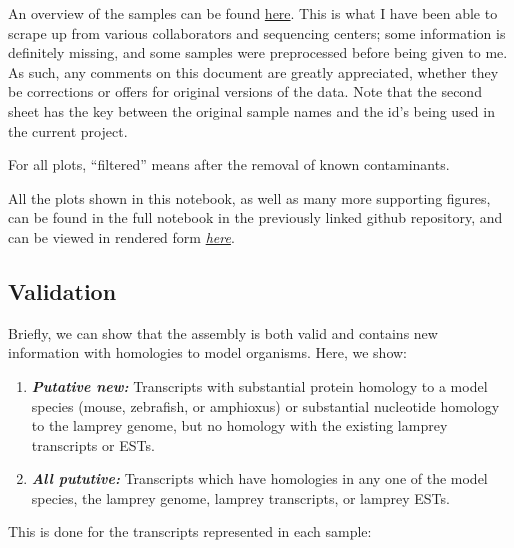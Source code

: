 \documentclass{article}
\begin{document}
An overview of the samples can be found
\href{https://docs.google.com/spreadsheet/ccc?key=0AqkPW_VPT5rAdEdmczhDeWg4UEZWdmh4dElqeXFiUlE\&usp=sharing}{here}.
This is what I have been able to scrape up from various collaborators
and sequencing centers; some information is definitely missing, and some
samples were preprocessed before being given to me. As such, any
comments on this document are greatly appreciated, whether they be
corrections or offers for original versions of the data. Note that the
second sheet has the key between the original sample names and the id's
being used in the current project.

For all plots, ``filtered'' means after the removal of known
contaminants.

All the plots shown in this notebook, as well as many more supporting
figures, can be found in the full notebook in the previously linked
github repository, and can be viewed in rendered form
\emph{\href{http://nbviewer.ipython.org/github/camillescott/2013-lamprey/blob/lamp3/pub/tale_of_two_transcriptomes_compute.ipynb}{here}}.


    \subsection{Validation}


    Briefly, we can show that the assembly is both valid and contains new
information with homologies to model organisms. Here, we show:

\begin{enumerate}
\def\labelenumi{\arabic{enumi}.}
\item
  \emph{\textbf{Putative new:}} Transcripts with substantial protein
  homology to a model species (mouse, zebrafish, or amphioxus) or
  substantial nucleotide homology to the lamprey genome, but no homology
  with the existing lamprey transcripts or ESTs.
\item
  \emph{\textbf{All pututive:}} Transcripts which have homologies in any
  one of the model species, the lamprey genome, lamprey transcripts, or
  lamprey ESTs.
\end{enumerate}

This is done for the transcripts represented in each sample:
\end{document}
